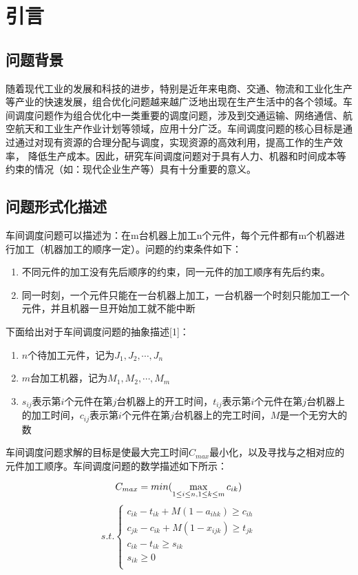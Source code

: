 \documentclass[UTF8]{ctexart}
\begin{document}
\section{引言}
	\subsection{问题背景}
	随着现代工业的发展和科技的进步，特别是近年来电商、交通、物流和工业化生产等产业的快速发展，组合优化问题越来越广泛地出现在生产生活中的各个领域。车间调度问题作为组合优化中一类重要的调度问题，涉及到交通运输、网络通信、航空航天和工业生产作业计划等领域，应用十分广泛。车间调度问题的核心目标是通过通过对现有资源的合理分配与调度，实现资源的高效利用，提高工作的生产效率，
	降低生产成本。因此，研究车间调度问题对于具有人力、机器和时间成本等约束的情况（如：现代企业生产等）具有十分重要的意义。

	\subsection{问题形式化描述}
	\par
	车间调度问题可以描述为：在m台机器上加工n个元件，每个元件都有m个机器进行加工（机器加工的顺序一定）。问题的约束条件如下：
	\begin{enumerate}
		\def\labelenumi{\arabic{enumi}.}
		\item
		不同元件的加工没有先后顺序的约束，同一元件的加工顺序有先后约束。
		\item
		同一时刻，一个元件只能在一台机器上加工，一台机器一个时刻只能加工一个元件，并且机器一旦开始加工就不能中断
	\end{enumerate}
\par
下面给出对于车间调度问题的抽象描述[1]：

\begin{enumerate}
	\def\labelenumi{\arabic{enumi}.}
	\item
	\(n\)个待加工元件，记为\(J_1,J_2,\cdots,J_n\)
	\item
	\(m\)台加工机器，记为\(M_1,M_2,\cdots,M_m\)
	\item
	\(s_{ij}\)表示第\(i\)个元件在第\(j\)台机器上的开工时间，\(t_{ij}\)表示第\(i\)个元件在第\(j\)台机器上的加工时间，\(c_{ij}\)表示第\(i\)个元件在第\(j\)台机器上的完工时间，\(M\)是一个无穷大的数
\end{enumerate}


车间调度问题求解的目标是使最大完工时间\(C_{max}\)最小化，以及寻找与之相对应的元件加工顺序。车间调度问题的数学描述如下所示：

$$
	C_{max}=min(\max\limits_{1\leq i\leq n,1\leq k\leq m}c_{ik}) 
\\
$$
$$
s.t.
\left\{  
\begin{array}{l}  
	c_{ik}-t_{ik}+M(1-a_{ihk})\geq c_{ih} \\
	c_{jk}-c_{ik}+M(1-x_{ijk})\geq t_{jk} \\
	c_{ik}-t_{ik}\geq s_{ik} \\
	s_{ik}\geq 0 \\
\end{array}  
\right.
$$
\end{document}
